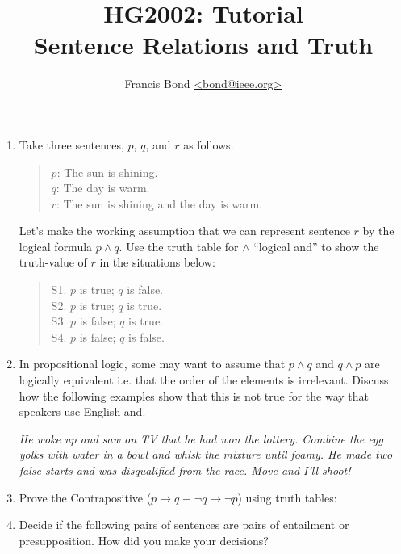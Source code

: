 \documentclass[a4paper]{article}
\title{\vspace*{-30mm}HG2002: Tutorial \\  Sentence Relations and Truth}
\author{Francis Bond \url{<bond@ieee.org>}}
\date{}%
\newcommand{\ix}{\ex\it}
\begin{document}
\maketitle

\begin{enumerate}
\item Take three sentences, $p$, $q$, and $r$ as follows. 

  \begin{quotation}
    \noindent $p$: The sun is shining. \\
    $q$: The day is warm. \\
    $r$: The sun is shining and the day is warm. 
  \end{quotation}

  Let’s make the working assumption that we can represent sentence $r$
  by the logical formula $p \wedge q$. Use the truth table for $\wedge$ ``logical and'' to
  show the truth-value of $r$ in the situations below:
  \begin{quotation}
    \noindent S1. $p$ is true; $q$ is false.\\
    S2. $p$ is true; $q$ is true.\\
    S3. $p$ is false; $q$ is true. \\
    S4. $p$ is false; $q$ is false.
  \end{quotation}
\item  In propositional logic, some may want to assume that $p \wedge q$ and 
$q \wedge p$ are logically
equivalent i.e. that the order of the elements is irrelevant. Discuss how the following
examples show that this is not true for the way that speakers use English and. 
\begin{exe}
  \ix He woke up and saw on TV that he had won the lottery. 
  \ix Combine the egg yolks with water in a bowl and whisk the mixture until 
  foamy.
  \ix  He made two false starts and was disqualified from the race.
  \ix Move and I'll shoot! 
\end{exe}

\item Prove the Contrapositive ($p \rightarrow q \equiv \neg q \rightarrow \neg p$) using truth tables:

\item  Decide if the following pairs of sentences are pairs of entailment or 
presupposition. How did you make your decisions? 


\end{enumerate}
\end{document}

